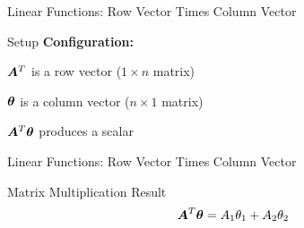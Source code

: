 \documentclass[handout]{beamer}
\begin{document}
\begin{frame}{Linear Functions: Row Vector Times Column Vector}
\begin{definitionbox}{Setup}
\textbf{Configuration:}
\cleanitemize
{
    \item $\bm{A} ^T$ is a row vector ($1 \times n$ matrix)
    \item $\bm{\theta}$ is a column vector ($n \times 1$ matrix) 
    \item $\bm{A}^T\bm{\bm{\theta}}$ produces a scalar
}
\end{definitionbox}

\end{frame}

\begin{frame}{Linear Functions: Row Vector Times Column Vector}
\begin{keypointsbox}{Matrix Multiplication Result}
$$\bm{A}^T \bm{\theta} = A_{1}\theta_{1} + A_{2}\theta_{2}$$
\end{keypointsbox}

\end{frame}
\end{document}
